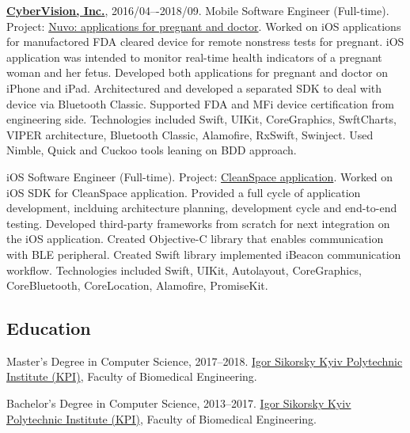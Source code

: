 \documentclass{nk-resume}
\begin{document}
\textbf{\href{https://www.cybervisiontech.com}{CyberVision, Inc.}}, 2016/04–-2018/09.
\newline Mobile Software Engineer (Full-time). Project: \href{https://www.nuvocares.com/solutions}{Nuvo: applications for pregnant and doctor}.
\newline Worked on iOS applications for manufactored FDA cleared device for remote nonstress tests for pregnant. 
iOS application was intended to monitor real-time health indicators of a pregnant woman and her fetus. 
Developed both applications for pregnant and doctor on iPhone and iPad.
Architectured and developed a separated SDK to deal with device via Bluetooth Classic.
Supported FDA and MFi device certification from engineering side.
\newline Technologies included Swift, UIKit, CoreGraphics, SwftCharts, VIPER architecture, 
Bluetooth Classic, Alamofire, RxSwift, Swinject. Used Nimble, Quick and Cuckoo tools leaning on BDD approach.

\vspace*{7px}

iOS Software Engineer (Full-time). Project: \href{https://www.sensynehealth.com/cleanspace}{CleanSpace application}.
\newline Worked on iOS SDK for CleanSpace application. 
Provided a full cycle of application development, inclduing architecture planning, 
development cycle and end-to-end testing.
Developed third-party frameworks from scratch for next integration on the iOS application.
Created Objective-C library that enables communication with BLE peripheral.
Created Swift library implemented iBeacon communication workflow. 
\newline Technologies included Swift, UIKit, Autolayout, CoreGraphics, CoreBluetooth, CoreLocation, Alamofire, PromiseKit.


\subsection*{Education}

\begin{samepage}
Master's Degree in Computer Science, 2017--2018.
\newline \href{https://kpi.ua/en}{Igor Sikorsky Kyiv Polytechnic Institute (KPI)}, Faculty of Biomedical Engineering.

\vspace*{7px}

Bachelor's Degree in Computer Science, 2013--2017.
\newline \href{https://kpi.ua/en}{Igor Sikorsky Kyiv Polytechnic Institute (KPI)}, Faculty of Biomedical Engineering.
\end{samepage}
\end{document}
